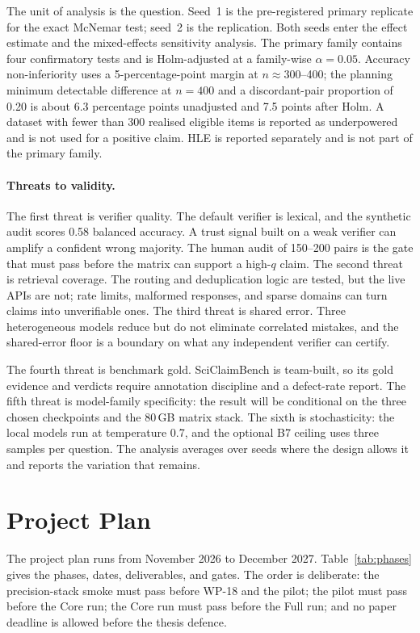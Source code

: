 The unit of analysis is the question. Seed~1 is the pre-registered primary replicate for the exact McNemar test; seed~2 is the replication. Both seeds enter the effect estimate and the mixed-effects sensitivity analysis. The primary family contains four confirmatory tests and is Holm-adjusted at a family-wise $\alpha=0.05$. Accuracy non-inferiority uses a 5-percentage-point margin at $n\approx300$--400; the planning minimum detectable difference at $n=400$ and a discordant-pair proportion of 0.20 is about 6.3 percentage points unadjusted and 7.5 points after Holm. A dataset with fewer than 300 realised eligible items is reported as underpowered and is not used for a positive claim. HLE is reported separately and is not part of the primary family.

\paragraph*{Threats to validity.}
The first threat is verifier quality. The default verifier is lexical, and the synthetic audit scores 0.58 balanced accuracy. A trust signal built on a weak verifier can amplify a confident wrong majority. The human audit of 150--200 pairs is the gate that must pass before the matrix can support a high-$q$ claim. The second threat is retrieval coverage. The routing and deduplication logic are tested, but the live APIs are not; rate limits, malformed responses, and sparse domains can turn claims into unverifiable ones. The third threat is shared error. Three heterogeneous models reduce but do not eliminate correlated mistakes, and the shared-error floor is a boundary on what any independent verifier can certify.

The fourth threat is benchmark gold. SciClaimBench is team-built, so its gold evidence and verdicts require annotation discipline and a defect-rate report. The fifth threat is model-family specificity: the result will be conditional on the three chosen checkpoints and the 80\,GB matrix stack. The sixth is stochasticity: the local models run at temperature 0.7, and the optional B7 ceiling uses three samples per question. The analysis averages over seeds where the design allows it and reports the variation that remains.

\section{Project Plan}\label{sec:project-plan}

The project plan runs from November 2026 to December 2027. Table~\ref{tab:phases} gives the phases, dates, deliverables, and gates. The order is deliberate: the precision-stack smoke must pass before WP-18 and the pilot; the pilot must pass before the Core run; the Core run must pass before the Full run; and no paper deadline is allowed before the thesis defence.

